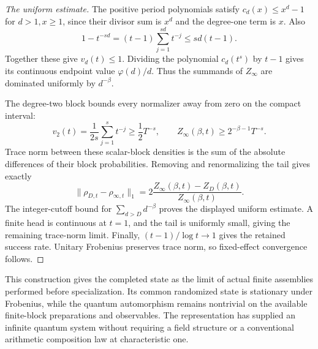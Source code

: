\begin{proof}[The uniform estimate]
The positive period polynomials satisfy
$c_d(x)\leq x^d-1$ for $d>1,x\geq1$, since their divisor sum is $x^d$
and the degree-one term is $x$. Also
\[
 1-t^{-sd}=(t-1)\sum_{j=1}^{sd}t^{-j}\leq sd(t-1).
\]
Together these give $v_d(t)\leq1$. Dividing the polynomial $c_d(t^s)$
by $t-1$ gives its continuous endpoint value $\varphi(d)/d$.
Thus the summands of $Z_\infty$ are dominated uniformly by $d^{-\beta}$.

The degree-two block bounds every normalizer away from zero on the compact
interval:
\[
 v_2(t)=\frac1{2s}\sum_{j=1}^s t^{-j}\geq\frac12T^{-s},\qquad
 Z_\infty(\beta,t)\geq2^{-\beta-1}T^{-s}.
\]
Trace norm between these scalar-block densities is the sum of the absolute
differences of their block probabilities. Removing and renormalizing the
tail gives exactly
\[
 \|\rho_{D,t}-\rho_{\infty,t}\|_1
 =2\frac{Z_\infty(\beta,t)-Z_D(\beta,t)}{Z_\infty(\beta,t)}.
\]
The integer-cutoff bound for $\sum_{d>D}d^{-\beta}$ proves the displayed
uniform estimate. A finite head is continuous at $t=1$, and the tail is
uniformly small, giving the remaining trace-norm limit. Finally,
$(t-1)/\log t\to1$ gives the retained success rate. Unitary Frobenius
preserves trace norm, so fixed-effect convergence follows.
\end{proof}

This construction gives the completed state as the limit of actual finite
assemblies performed before specialization. Its common randomized state
is stationary under Frobenius, while the quantum automorphism remains
nontrivial on the available finite-block preparations and observables.
The representation has supplied an infinite quantum system without
requiring a field structure or a conventional arithmetic composition law
at characteristic one.

